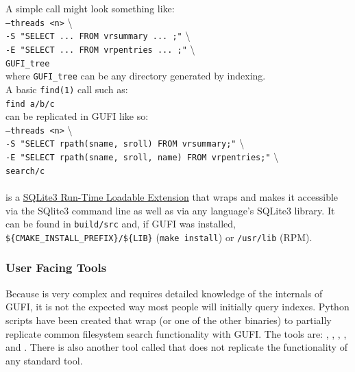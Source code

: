 A simple \gufiquery call might look something like: \\

\gufiquery \texttt{--threads <n>} \textbackslash \\
\indent \indent \texttt{-S "SELECT ... FROM vrsummary ... ;"} \textbackslash \\
\indent \indent \texttt{-E "SELECT ... FROM vrpentries ... ;"} \textbackslash \\
\indent \indent \texttt{GUFI\_tree} \\

where \texttt{GUFI\_tree} can be any directory generated by indexing. \\

A basic \texttt{find(1)} call such as: \\

\texttt{find a/b/c} \\

can be replicated in GUFI like so: \\

\gufiquery \texttt{--threads <n>} \textbackslash \\
\indent \indent \texttt{-S "SELECT rpath(sname, sroll) FROM vrsummary;"} \textbackslash \\
\indent \indent \texttt{-E "SELECT rpath(sname, sroll, name) FROM vrpentries;"} \textbackslash \\
\indent \indent \texttt{search/c}

\paragraph{\gufivt}

\gufivt is a \href{https://sqlite.org/loadext.html}{SQLite3 Run-Time
 Loadable Extension} that wraps \gufiquery and makes it accessible
via the SQlite3 command line as well as via any language's SQLite3
library. It can be found in \texttt{build/src} and, if GUFI was
installed, \texttt{\$\{CMAKE\_INSTALL\_PREFIX\}/\$\{LIB\}}
(\texttt{make install}) or \texttt{/usr/lib} (RPM).

\subsubsection{User Facing Tools}
\label{sec:user_facing_tools}
Because \gufiquery is very complex and requires detailed knowledge of
the internals of GUFI, it is not the expected way most people will
initially query indexes. Python scripts have been created that wrap
\gufiquery (or one of the other binaries) to partially replicate
common filesystem search functionality with GUFI. The tools are:
\gufidu, \gufifind, \gufigetfattr, \gufils, and \gufistat. There is
also another tool called \gufistats that does not replicate the
functionality of any standard tool.

